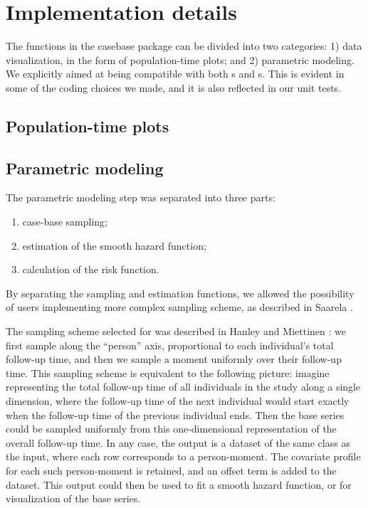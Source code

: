 \documentclass[
]{jss}
\providecommand{\tightlist}{%
  \setlength{\itemsep}{0pt}\setlength{\parskip}{0pt}}
\begin{document}
\hypertarget{implementation-details}{%
\section{Implementation details}\label{implementation-details}}

The functions in the casebase package can be divided into two
categories: 1) data visualization, in the form of population-time plots;
and 2) parametric modeling. We explicitly aimed at being compatible with
both s and s. This is evident in some
of the coding choices we made, and it is also reflected in our unit
tests.

\hypertarget{population-time-plots}{%
\subsection{Population-time plots}\label{population-time-plots}}

\hypertarget{parametric-modeling}{%
\subsection{Parametric modeling}\label{parametric-modeling}}

The parametric modeling step was separated into three parts:

\begin{enumerate}
\def\labelenumi{\arabic{enumi}.}
\tightlist
\item
  case-base sampling;
\item
  estimation of the smooth hazard function;
\item
  calculation of the risk function.
\end{enumerate}

By separating the sampling and estimation functions, we allowed the
possibility of users implementing more complex sampling scheme, as
described in Saarela \citeyearpar{saarela2016case}.

The sampling scheme selected for  was described in
Hanley and Miettinen \citeyearpar{hanley2009fitting}: we first sample
along the ``person'' axis, proportional to each individual's total
follow-up time, and then we sample a moment uniformly over their
follow-up time. This sampling scheme is equivalent to the following
picture: imagine representing the total follow-up time of all
individuals in the study along a single dimension, where the follow-up
time of the next individual would start exactly when the follow-up time
of the previous individual ends. Then the base series could be sampled
uniformly from this one-dimensional representation of the overall
follow-up time. In any case, the output is a dataset of the same class
as the input, where each row corresponds to a person-moment. The
covariate profile for each such person-moment is retained, and an offset
term is added to the dataset. This output could then be used to fit a
smooth hazard function, or for visualization of the base series.
\end{document}
